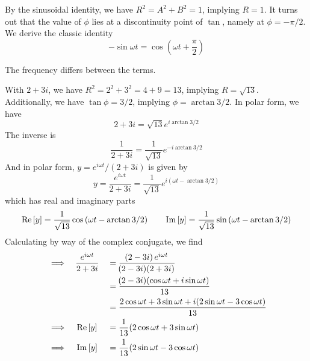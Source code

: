 \documentclass[a4paper]{article}
\begin{document}
\vspace{12pt}


By the sinusoidal identity, we have \(R^{2} = A^{2} + B^{2} = 1\), implying \(R = 1\). It turns out that the value of \(\phi \) lies at a discontinuity point of \(\tan\), namely at \(\phi = - \pi /2\). We derive the classic identity
\[
	- \sin \omega t = \cos\left( \omega t + \frac{\pi }{2}\right)
\]


The frequency differs between the terms.

\vspace{12pt}


With \(2 + 3i\), we have \(R^{2} = 2^{2} + 3^{2} = 4 + 9 = 13\), implying \(R = \sqrt{13}\). Additionally, we have \(\tan \phi = 3/2\), implying \(\phi = \arctan 3/2 \). In polar form, we have
\[
	2 + 3i = \sqrt{13} e^{i \arctan 3/2}
\]
The inverse is
\[
	\frac{1}{2 + 3i} = \frac{1}{\sqrt{13}} e^{-i \arctan 3/2}
\]
And in polar form, \(y = e^{i \omega t}/ \!\left( 2 + 3i \right) \) is given by
\[
	y = \frac{e^{i \omega t}}{2 + 3i} = \frac{1}{\sqrt{13}} e^{i \!\left( \omega t - \arctan 3/2 \right) }
\]
which has real and imaginary parts
\[
	\operatorname{Re} \left[ y \right] = \frac{1}{\sqrt{13}} \cos\left( \omega t - \arctan 3/2 \right) \qquad \operatorname{Im} \left[ y \right] = \frac{1}{\sqrt{13}} \sin\left( \omega t - \arctan 3/2 \right)
\]
Calculating by way of the complex conjugate, we find
\begin{alignat*}{3}
	&\implies && \frac{e^{i \omega t}}{2 + 3i} && = \frac{\!\left( 2 - 3i \right) e^{i \omega t}}{\!\left( 2 - 3i \right) \!\left( 2 + 3i \right) } \\
	& && && = \frac{\!\left( 2 - 3i \right) \!\left( \cos \omega t + i \sin \omega t \right) }{13}  \\
	& && && = \frac{2 \cos \omega t + 3 \sin \omega t + i \!\left( 2 \sin \omega t - 3 \cos \omega t \right) }{13} \\
	&\implies && \Real \left[ y \right] && = \frac{1}{13} \!\left( 2 \cos \omega t + 3 \sin \omega t\right) \\
	&\implies && \Imag \left[ y \right] && = \frac{1}{13} \!\left( 2 \sin \omega t - 3 \cos \omega t \right) 
\end{alignat*}
\end{document}
